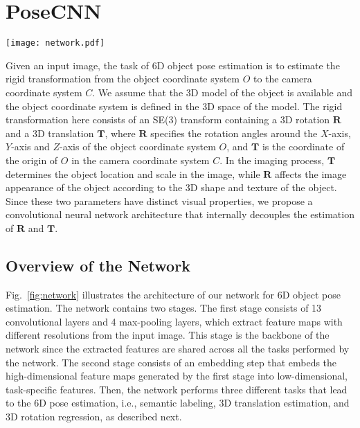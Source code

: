 \documentclass[conference]{IEEEtran}
\begin{document}
\section{PoseCNN}

\begin{figure*}
	\centering
	\texttt{[image: network.pdf]}
	\caption{Architecture of PoseCNN for 6D object pose estimation.}
	\label{fig:network}
	\vspace{-4mm}
\end{figure*}

Given an input image, the task of 6D object pose estimation is to estimate the rigid transformation from the object coordinate system $O$ to the camera coordinate system $C$. We assume that the 3D model of the object is available and the object coordinate system is defined in the 3D space of the model. The rigid transformation here consists of an SE(3) transform containing a 3D rotation $\mathbf{R}$ and a 3D translation $\mathbf{T}$, where $\mathbf{R}$ specifies the rotation angles around the $X$-axis, $Y$-axis and $Z$-axis of the object coordinate system $O$, and $\mathbf{T}$ is the coordinate of the origin of $O$ in the camera coordinate system $C$.
In the imaging process, $\mathbf{T}$ determines the object location and scale in the image, while $\mathbf{R}$ affects the image appearance of the object according to the 3D shape and texture of the object. Since these two parameters have distinct visual properties, we propose a convolutional neural network architecture that internally decouples the estimation of $\mathbf{R}$ and $\mathbf{T}$.

\subsection{Overview of the Network}

Fig.~\ref{fig:network} illustrates the architecture of our network for 6D object pose estimation. The network contains two stages. The first stage consists of 13 convolutional layers and 4 max-pooling layers, which extract feature maps with different resolutions from the input image. This stage is the backbone of the network since the extracted features are shared across all the tasks performed by the network. The second stage consists of an embedding step that embeds the high-dimensional feature maps generated by the first stage into low-dimensional,  task-specific features. Then, the network performs three different tasks that lead to the 6D pose estimation, i.e., semantic labeling, 3D translation estimation, and 3D rotation regression, as described next.
\end{document}
